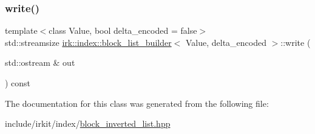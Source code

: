 \mbox{\label{classirk_1_1index_1_1block__list__builder_a470564f1666a0a5370a8d917e5d50c3a}} 
\subsubsection{\texorpdfstring{write()}{write()}}
{\footnotesize\ttfamily template$<$class Value, bool delta\+\_\+encoded = false$>$ \\
std\+::streamsize \mbox{\hyperlink{classirk_1_1index_1_1block__list__builder}{irk\+::index\+::block\+\_\+list\+\_\+builder}}$<$ Value, delta\+\_\+encoded $>$\+::write (\begin{DoxyParamCaption}\item[{std\+::ostream \&}]{out }\end{DoxyParamCaption}) const\hspace{0.3cm}{\ttfamily [inline]}}



The documentation for this class was generated from the following file\+:\begin{DoxyCompactItemize}
\item 
include/irkit/index/\mbox{\hyperlink{block__inverted__list_8hpp}{block\+\_\+inverted\+\_\+list.\+hpp}}\end{DoxyCompactItemize}
